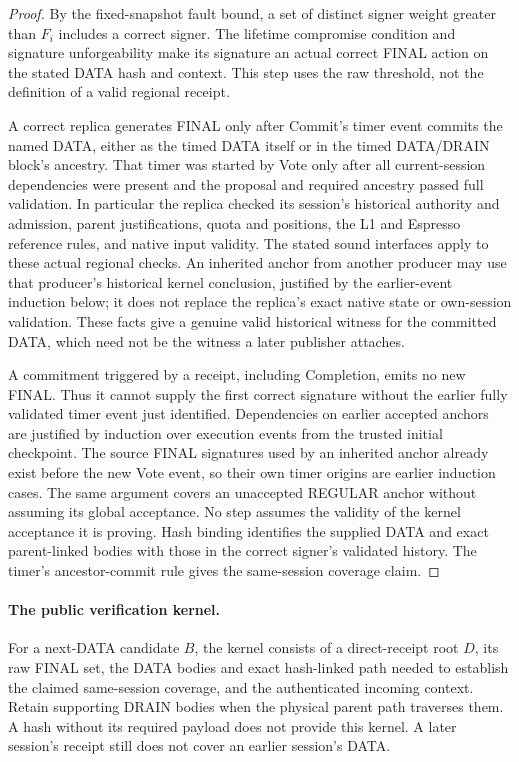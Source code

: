 \begin{proof}
By the fixed-snapshot fault bound, a set of distinct signer weight
greater than $F_i$ includes a correct signer. The lifetime compromise
condition and signature unforgeability make its signature an actual
correct FINAL action on the stated DATA hash and context. This step
uses the raw threshold, not the definition of a valid regional receipt.

A correct replica generates FINAL only after Commit's timer event
commits the named DATA, either as the timed DATA itself or in the timed
DATA/DRAIN block's ancestry. That timer was started by Vote only after
all current-session dependencies were present and the proposal and
required ancestry passed full validation. In particular the replica
checked its session's historical authority and admission, parent
justifications, quota and positions, the L1 and Espresso reference
rules, and native input validity. The stated sound interfaces apply to
these actual regional checks. An inherited anchor from another producer
may use that producer's historical kernel conclusion, justified by the
earlier-event induction below; it does not replace the replica's exact
native state or own-session validation. These facts give a genuine valid
historical witness for the committed DATA, which need not be the witness
a later publisher attaches.

A commitment triggered by a receipt, including Completion, emits no
new FINAL. Thus it cannot supply the first correct signature without
the earlier fully validated timer event just identified. Dependencies
on earlier accepted anchors are justified by induction over execution
events from the trusted initial checkpoint. The source FINAL signatures
used by an inherited anchor already exist before the new Vote event,
so their own timer origins are earlier induction cases. The same
argument covers an unaccepted REGULAR anchor without assuming its
global acceptance. No step assumes the validity of the kernel acceptance
it is proving. Hash binding identifies the
supplied DATA and exact parent-linked bodies with those in the correct
signer's validated history. The timer's ancestor-commit rule gives the
same-session coverage claim.
\end{proof}

\paragraph{The public verification kernel.}
For a next-DATA candidate $B$, the kernel consists of a direct-receipt
root $D$, its raw FINAL set, the DATA bodies and exact hash-linked path
needed to establish the claimed same-session coverage, and the
authenticated incoming context. Retain supporting DRAIN bodies when
the physical parent path traverses them. A hash without its required
payload does not provide this kernel. A later session's receipt still
does not cover an earlier session's DATA.

